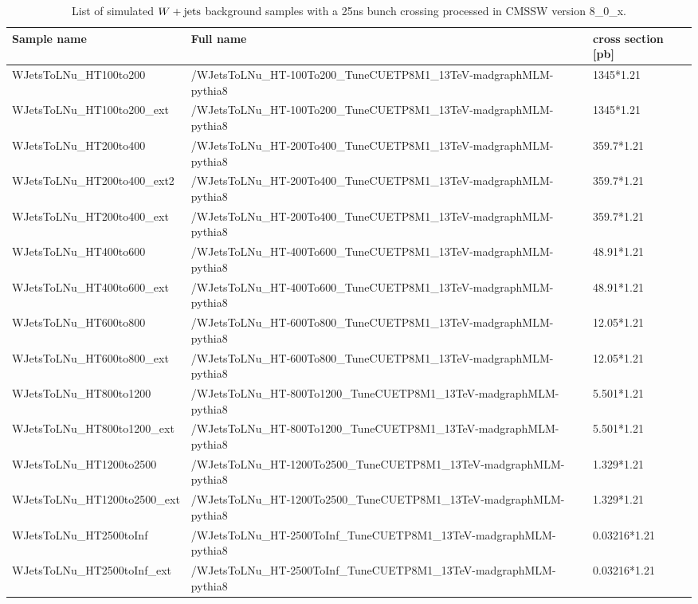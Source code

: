    \begin{table}[htbp]
  \tiny
  \vspace{0.2cm}
  \begin{tabular}{|l|l|l|}
    \hline
    Sample name & Full name & cross section [pb] \\
    \hline
      WJetsToLNu\_HT100to200 & /WJetsToLNu\_HT-100To200\_TuneCUETP8M1\_13TeV-madgraphMLM-pythia8 & 1345*1.21 \\
    WJetsToLNu\_HT100to200\_ext & /WJetsToLNu\_HT-100To200\_TuneCUETP8M1\_13TeV-madgraphMLM-pythia8 & 1345*1.21 \\
    WJetsToLNu\_HT200to400 & /WJetsToLNu\_HT-200To400\_TuneCUETP8M1\_13TeV-madgraphMLM-pythia8 & 359.7*1.21 \\
    WJetsToLNu\_HT200to400\_ext2 & /WJetsToLNu\_HT-200To400\_TuneCUETP8M1\_13TeV-madgraphMLM-pythia8 & 359.7*1.21 \\
    WJetsToLNu\_HT200to400\_ext & /WJetsToLNu\_HT-200To400\_TuneCUETP8M1\_13TeV-madgraphMLM-pythia8 & 359.7*1.21 \\
    WJetsToLNu\_HT400to600 & /WJetsToLNu\_HT-400To600\_TuneCUETP8M1\_13TeV-madgraphMLM-pythia8 & 48.91*1.21 \\
    WJetsToLNu\_HT400to600\_ext & /WJetsToLNu\_HT-400To600\_TuneCUETP8M1\_13TeV-madgraphMLM-pythia8 & 48.91*1.21 \\
    WJetsToLNu\_HT600to800 & /WJetsToLNu\_HT-600To800\_TuneCUETP8M1\_13TeV-madgraphMLM-pythia8 & 12.05*1.21 \\
    WJetsToLNu\_HT600to800\_ext & /WJetsToLNu\_HT-600To800\_TuneCUETP8M1\_13TeV-madgraphMLM-pythia8 & 12.05*1.21 \\
    WJetsToLNu\_HT800to1200 & /WJetsToLNu\_HT-800To1200\_TuneCUETP8M1\_13TeV-madgraphMLM-pythia8 & 5.501*1.21 \\
    WJetsToLNu\_HT800to1200\_ext & /WJetsToLNu\_HT-800To1200\_TuneCUETP8M1\_13TeV-madgraphMLM-pythia8 & 5.501*1.21 \\
    WJetsToLNu\_HT1200to2500 & /WJetsToLNu\_HT-1200To2500\_TuneCUETP8M1\_13TeV-madgraphMLM-pythia8 & 1.329*1.21 \\
    WJetsToLNu\_HT1200to2500\_ext & /WJetsToLNu\_HT-1200To2500\_TuneCUETP8M1\_13TeV-madgraphMLM-pythia8 & 1.329*1.21 \\
    WJetsToLNu\_HT2500toInf & /WJetsToLNu\_HT-2500ToInf\_TuneCUETP8M1\_13TeV-madgraphMLM-pythia8 & 0.03216*1.21 \\
    WJetsToLNu\_HT2500toInf\_ext & /WJetsToLNu\_HT-2500ToInf\_TuneCUETP8M1\_13TeV-madgraphMLM-pythia8 & 0.03216*1.21 \\
       \hline
  \end{tabular}
  \caption{List of simulated $W+\textrm{jets}$ background samples with a 25ns bunch crossing processed in CMSSW version 8\_0\_x.}
  \label{tab:Wsamples}
\end{table}  
